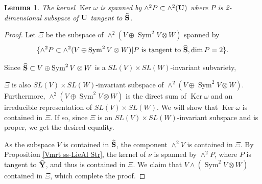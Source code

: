 \documentclass[12pt]{amsart}
\theoremstyle{plain}
\newtheorem{lemma} [theorem]{Lemma}
\theoremstyle{definition}
\def\Sym{\operatorname{Sym}}
\def\Ker{\operatorname{Ker}}
\begin{document}
\begin{lemma}\label{tangent space of the cone V-2}
The kernel $\Ker \omega $ is spanned by $\wedge^2 P \subset \wedge^2({\bf U})$ where  $P$ is 2-dimensional subspace of ${\bf U}$ tangent to $\widehat{ \bf S }$.
\end{lemma}

\begin{proof} Let $\Xi$ be the subspace of $\wedge^2 (V\oplus \Sym^2 V \otimes W)$ spanned by
   \begin{eqnarray*} \{ \wedge^2 P \subset \wedge^2(V\oplus \Sym^2V \otimes W) | P \mbox{ is tangent to } \widehat{ \bf S }, \dim P=2 \}. \end{eqnarray*}

Since $\widehat{ \bf S } \subset V\oplus \Sym^2V \otimes W $ is a $SL(V)\times SL(W)$-invariant subvariety,

$\Xi$  is also $SL(V)\times SL(W)$-invariant subspace of $\wedge^2 (V\oplus \Sym^2 V \otimes W)$. Furthermore, $\wedge^2 (V\oplus \Sym^2 V \otimes W)$ is the direct sum of $\Ker \omega$ and an irreducible representation of $SL(V) \times SL(W)$.
We will show that $\Ker \omega  $ is contained in $ \Xi$. If so, since $\Xi$ is an $SL(V) \times SL(W)$-invariant subspace and is proper, we get the desired equality.


As the subspace $V$ is contained in $\widehat{\bf S}$, the component $\wedge^2 V$ is contained in $\Xi$.
By Proposition \ref{Vmrt ss-LieAl Str}, the kernel of $\nu$ is spanned by $\wedge^2 P$, where $P$ is tangent to $\widehat{\bf Y}$, and thus is contained in $\Xi$.
We claim that  $V \wedge (\Sym^2 V \otimes W)$ contained in $\Xi$, which complete the proof.


\end{proof}
\end{document}
